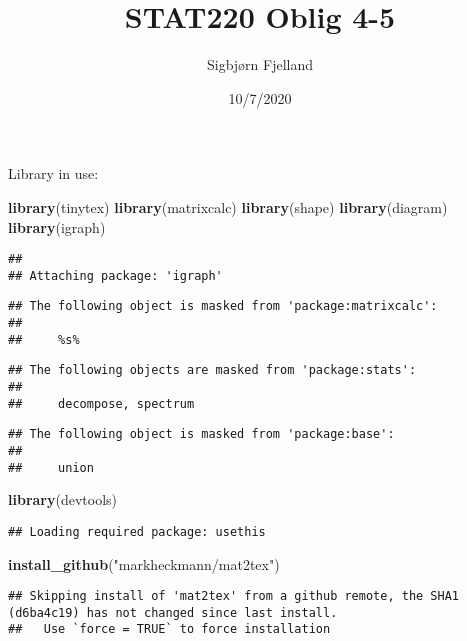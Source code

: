 \documentclass[]{article}
\title{STAT220 Oblig 4-5}
\author{Sigbjørn Fjelland}
\date{10/7/2020}
\newenvironment{Shaded}{\begin{snugshade}}{\end{snugshade}}
\newcommand{\KeywordTok}[1]{\textcolor[rgb]{0.13,0.29,0.53}{\textbf{#1}}}
\newcommand{\NormalTok}[1]{#1}
\newcommand{\StringTok}[1]{\textcolor[rgb]{0.31,0.60,0.02}{#1}}
\begin{document}
\maketitle

Library in use:

\begin{Shaded}
\begin{Highlighting}[]
\KeywordTok{library}\NormalTok{(tinytex)}
\KeywordTok{library}\NormalTok{(matrixcalc)}
\KeywordTok{library}\NormalTok{(shape)}
\KeywordTok{library}\NormalTok{(diagram)}
\KeywordTok{library}\NormalTok{(igraph)}
\end{Highlighting}
\end{Shaded}

\begin{verbatim}
## 
## Attaching package: 'igraph'
\end{verbatim}

\begin{verbatim}
## The following object is masked from 'package:matrixcalc':
## 
##     %s%
\end{verbatim}

\begin{verbatim}
## The following objects are masked from 'package:stats':
## 
##     decompose, spectrum
\end{verbatim}

\begin{verbatim}
## The following object is masked from 'package:base':
## 
##     union
\end{verbatim}

\begin{Shaded}
\begin{Highlighting}[]
\KeywordTok{library}\NormalTok{(devtools)}
\end{Highlighting}
\end{Shaded}

\begin{verbatim}
## Loading required package: usethis
\end{verbatim}

\begin{Shaded}
\begin{Highlighting}[]
\KeywordTok{install_github}\NormalTok{(}\StringTok{"markheckmann/mat2tex"}\NormalTok{)}
\end{Highlighting}
\end{Shaded}

\begin{verbatim}
## Skipping install of 'mat2tex' from a github remote, the SHA1 (d6ba4c19) has not changed since last install.
##   Use `force = TRUE` to force installation
\end{verbatim}
\end{document}
